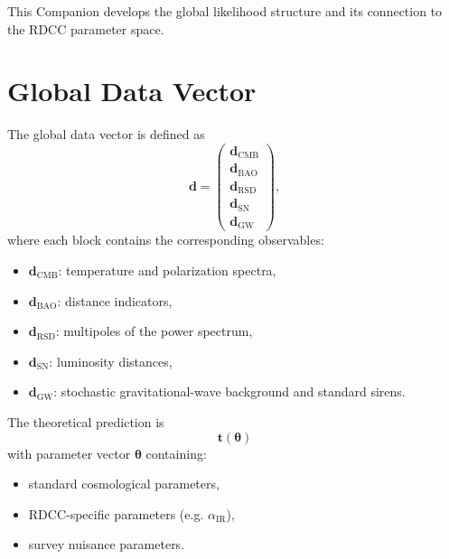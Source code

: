 \documentclass[11pt,a4paper]{article}
\begin{document}
This Companion develops the global likelihood structure and its connection to
the RDCC parameter space.

\section[Global Data Vector]{Global Data Vector}

The global data vector is defined as
\begin{equation}
\mathbf{d}
=
\begin{pmatrix}
\mathbf{d}_{\mathrm{CMB}} \\
\mathbf{d}_{\mathrm{BAO}} \\
\mathbf{d}_{\mathrm{RSD}} \\
\mathbf{d}_{\mathrm{SN}} \\
\mathbf{d}_{\mathrm{GW}}
\end{pmatrix},
\end{equation}
where each block contains the corresponding observables:
\begin{itemize}[leftmargin=0.8cm]
  \item $\mathbf{d}_{\mathrm{CMB}}$: temperature and polarization spectra,
  \item $\mathbf{d}_{\mathrm{BAO}}$: distance indicators,
  \item $\mathbf{d}_{\mathrm{RSD}}$: multipoles of the power spectrum,
  \item $\mathbf{d}_{\mathrm{SN}}$: luminosity distances,
  \item $\mathbf{d}_{\mathrm{GW}}$: stochastic gravitational-wave background
        and standard sirens.
\end{itemize}

The theoretical prediction is
\begin{equation}
\mathbf{t}(\boldsymbol{\theta})
\end{equation}
with parameter vector $\boldsymbol{\theta}$ containing:
\begin{itemize}[leftmargin=0.8cm]
  \item standard cosmological parameters,
  \item RDCC-specific parameters (e.g. $\alpha_{\mathrm{IR}}$),
  \item survey nuisance parameters.
\end{itemize}
\end{document}
